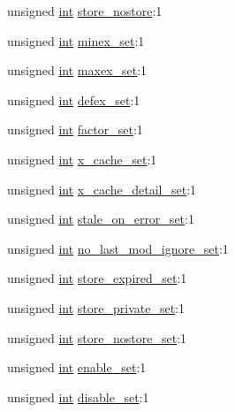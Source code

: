 \begin{DoxyCompactItemize}
\item 
unsigned \hyperlink{pcre_8txt_a42dfa4ff673c82d8efe7144098fbc198}{int} \hyperlink{structcache__dir__conf_a57eedc1ff72813bae6e611b46a084463}{store\+\_\+nostore}\+:1
\item 
unsigned \hyperlink{pcre_8txt_a42dfa4ff673c82d8efe7144098fbc198}{int} \hyperlink{structcache__dir__conf_a7fb3ac3113ebc0150da106811611eec7}{minex\+\_\+set}\+:1
\item 
unsigned \hyperlink{pcre_8txt_a42dfa4ff673c82d8efe7144098fbc198}{int} \hyperlink{structcache__dir__conf_a0b4facfd53b0e32cd6ada4452de94b82}{maxex\+\_\+set}\+:1
\item 
unsigned \hyperlink{pcre_8txt_a42dfa4ff673c82d8efe7144098fbc198}{int} \hyperlink{structcache__dir__conf_a34d2703f178b275f09d0e8a1b7a65f9b}{defex\+\_\+set}\+:1
\item 
unsigned \hyperlink{pcre_8txt_a42dfa4ff673c82d8efe7144098fbc198}{int} \hyperlink{structcache__dir__conf_a3ea149394898dc18f5727df2d20fde66}{factor\+\_\+set}\+:1
\item 
unsigned \hyperlink{pcre_8txt_a42dfa4ff673c82d8efe7144098fbc198}{int} \hyperlink{structcache__dir__conf_af9b5b3bb89a64fa8f7d8388388873e44}{x\+\_\+cache\+\_\+set}\+:1
\item 
unsigned \hyperlink{pcre_8txt_a42dfa4ff673c82d8efe7144098fbc198}{int} \hyperlink{structcache__dir__conf_adf26b61dd886f4053a523ca2f91f58a9}{x\+\_\+cache\+\_\+detail\+\_\+set}\+:1
\item 
unsigned \hyperlink{pcre_8txt_a42dfa4ff673c82d8efe7144098fbc198}{int} \hyperlink{structcache__dir__conf_a86fe83811a4b61200faf7dbb5fb6ef46}{stale\+\_\+on\+\_\+error\+\_\+set}\+:1
\item 
unsigned \hyperlink{pcre_8txt_a42dfa4ff673c82d8efe7144098fbc198}{int} \hyperlink{structcache__dir__conf_abb45f257622fd489f886dfb751d6e0fe}{no\+\_\+last\+\_\+mod\+\_\+ignore\+\_\+set}\+:1
\item 
unsigned \hyperlink{pcre_8txt_a42dfa4ff673c82d8efe7144098fbc198}{int} \hyperlink{structcache__dir__conf_a7b6536b719dac29dffd807f65ce42e26}{store\+\_\+expired\+\_\+set}\+:1
\item 
unsigned \hyperlink{pcre_8txt_a42dfa4ff673c82d8efe7144098fbc198}{int} \hyperlink{structcache__dir__conf_a171d0f2a44100b7ad0f57cd6341f1aa3}{store\+\_\+private\+\_\+set}\+:1
\item 
unsigned \hyperlink{pcre_8txt_a42dfa4ff673c82d8efe7144098fbc198}{int} \hyperlink{structcache__dir__conf_a083b196dc344200e3aa9562a72075b05}{store\+\_\+nostore\+\_\+set}\+:1
\item 
unsigned \hyperlink{pcre_8txt_a42dfa4ff673c82d8efe7144098fbc198}{int} \hyperlink{structcache__dir__conf_a68d150fbe1e4687ec78d69b2f6b50f3b}{enable\+\_\+set}\+:1
\item 
unsigned \hyperlink{pcre_8txt_a42dfa4ff673c82d8efe7144098fbc198}{int} \hyperlink{structcache__dir__conf_aa04642833fd4083bc51a9cc69306891d}{disable\+\_\+set}\+:1
\end{DoxyCompactItemize}


